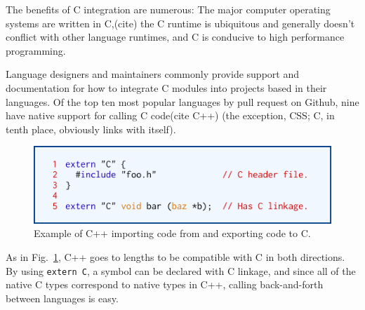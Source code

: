 The benefits of C integration are numerous: The major computer operating systems are written in C,(cite) the C runtime is ubiquitous and generally doesn't conflict with other language runtimes, and C is conducive to high performance programming.

Language designers and maintainers commonly provide support and documentation for how to integrate C modules into projects based in their languages.  Of the top ten most popular languages by pull request on Github\cite{Octoverse}, nine have native support for calling C code\cite{JavascriptCiface}\cite{PythonCiface}\cite{JavaCiface}\cite{RubyCiface}\cite{PHPCiface}\cite{DotNetCiface}\cite{GoCiface}(cite C++) (the exception, CSS; C, in tenth place, obviously links with itself).

\begin{figure}[htbp!]
        \centering
        \includegraphics[scale=0.25]{gfx/extern}
        \caption{Example of C++ importing code from and exporting code to C.}
        \label{fig:extern-example}
\end{figure}

As in Fig.~\ref{fig:extern-example}, C++ goes to lengths to be compatible with C in both directions.  By using \texttt{extern \textquotedbl{}C\textquotedbl{}}, a symbol can be declared with C linkage, and since all of the native C types correspond to native types in C++, calling back-and-forth between languages is easy.

